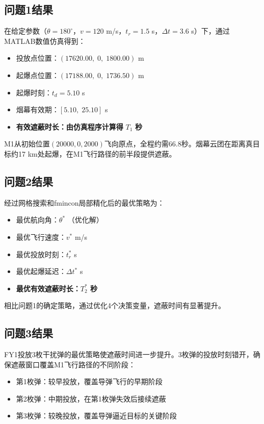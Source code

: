 
\subsection{问题1结果}

在给定参数（$\theta=180^\circ$，$v=120$ m/s，$t_r=1.5$ s，$\Delta t=3.6$ s）下，通过MATLAB数值仿真得到：

\begin{itemize}
    \item 投放点位置：$(17620.00,\; 0,\; 1800.00)$ m
    \item 起爆点位置：$(17188.00,\; 0,\; 1736.50)$ m
    \item 起爆时刻：$t_d = 5.10$ s
    \item 烟幕有效期：$[5.10,\; 25.10]$ s
    \item \textbf{有效遮蔽时长：由仿真程序计算得} $T_1$ \textbf{秒}
\end{itemize}

M1从初始位置$(20000,0,2000)$飞向原点，全程约需66.8秒。烟幕云团在距离真目标约17 km处起爆，在M1飞行路径的前半段提供遮蔽。

\subsection{问题2结果}

经过网格搜索和fmincon局部精化后的最优策略为：

\begin{itemize}
    \item 最优航向角：$\theta^*$ （优化解）
    \item 最优飞行速度：$v^*$ m/s
    \item 最优投放时刻：$t_r^*$ s
    \item 最优起爆延迟：$\Delta t^*$ s
    \item \textbf{最优有效遮蔽时长：$T_2^*$ 秒}
\end{itemize}

相比问题1的确定策略，通过优化4个决策变量，遮蔽时间有显著提升。

\subsection{问题3结果}

FY1投放3枚干扰弹的最优策略使遮蔽时间进一步提升。3枚弹的投放时刻错开，确保遮蔽窗口覆盖M1飞行路径的不同阶段：

\begin{itemize}
    \item 第1枚弹：较早投放，覆盖导弹飞行的早期阶段
    \item 第2枚弹：中期投放，在第1枚弹失效后接续遮蔽
    \item 第3枚弹：较晚投放，覆盖导弹逼近目标的关键阶段
\end{itemize}

